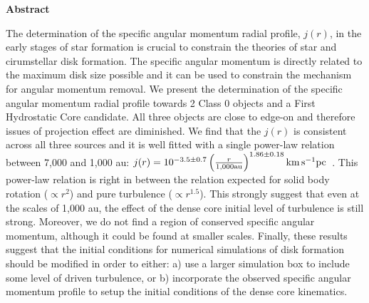 \textbf{Abstract}

The determination of the specific angular momentum radial profile, $j(r)$, in the early stages of star formation is crucial to constrain the theories of star and cirumstellar disk formation.
The specific angular momentum is directly related to the maximum disk size possible and 
it can be used to constrain the mechanism for angular momentum removal. 
We present the determination of the specific angular momentum radial profile towards 2 Class 0 objects and a First Hydrostatic Core candidate. 
All three objects are close to edge-on and therefore issues of projection effect are diminished. 
We find that the $j(r)$ is consistent across all three sources and it is well fitted with a single power-law relation between 7,000 and 1,000 au: 
$j(r) = 10^{-3.5\pm 0.7}\left( \frac{r}{1,000 \textrm{au}}\right)^{1.86\pm0.18} \rm{km\, s^{-1} pc}$~.
This power-law relation is right in between the relation expected for solid body rotation ($\propto r^2$) and pure turbulence ($\propto r^{1.5}$). 
This strongly suggest that even at the scales of 1,000 au, the effect of the dense core initial level of turbulence is still strong. 
Moreover, we do not find a region of conserved specific angular momentum, although it could be found at 
smaller scales. 
Finally, these results suggest that the initial conditions for numerical simulations of disk formation 
should be modified in order to either: 
a) use a larger simulation box to include some level of driven turbulence, or 
b) incorporate the observed specific angular momentum profile to setup the initial conditions of the dense core kinematics.